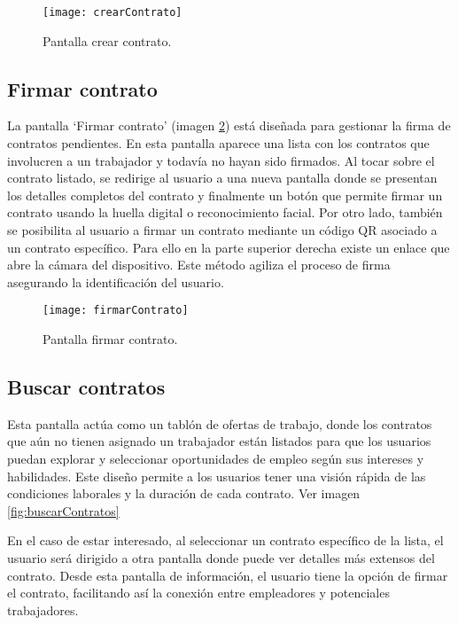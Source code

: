 \begin{figure}[h]
	\centering
	\texttt{[image: crearContrato]}
	\caption[Pantalla crear contrato]{Pantalla crear contrato.}
	\label{fig:crearContrato}
\end{figure}


\subsection{Firmar contrato}

La pantalla `Firmar contrato' (imagen \ref{fig:firmarContrato}) está diseñada para gestionar la firma de contratos pendientes.
En esta pantalla aparece una lista con los contratos que involucren a un trabajador y todavía no hayan sido firmados.
Al tocar sobre el contrato listado, se redirige al usuario a una nueva pantalla donde se presentan los detalles completos del contrato y finalmente un botón que permite firmar un contrato usando la huella digital o reconocimiento facial.
Por otro lado, también se posibilita al usuario a firmar un contrato mediante un código QR asociado a un contrato específico. Para ello en la parte superior derecha existe un enlace que abre la cámara del dispositivo.
Este método agiliza el proceso de firma asegurando la identificación del usuario.

\begin{figure}[h]
	\centering
	\texttt{[image: firmarContrato]}
	\caption[Pantalla firmar contrato]{Pantalla firmar contrato.}
	\label{fig:firmarContrato}
\end{figure}


\subsection{Buscar contratos}

Esta pantalla actúa como un tablón de ofertas de trabajo, donde los contratos que aún no tienen asignado un trabajador están listados para que los usuarios puedan explorar y seleccionar oportunidades de empleo según sus intereses y habilidades. 
Este diseño permite a los usuarios tener una visión rápida de las condiciones laborales y la duración de cada contrato. Ver imagen \ref{fig:buscarContratos}

En el caso de estar interesado, al seleccionar un contrato específico de la lista, el usuario será dirigido a otra pantalla donde puede ver detalles más extensos del contrato. Desde esta pantalla de información, el usuario tiene la opción de firmar el contrato, facilitando así la conexión entre empleadores y potenciales trabajadores.

